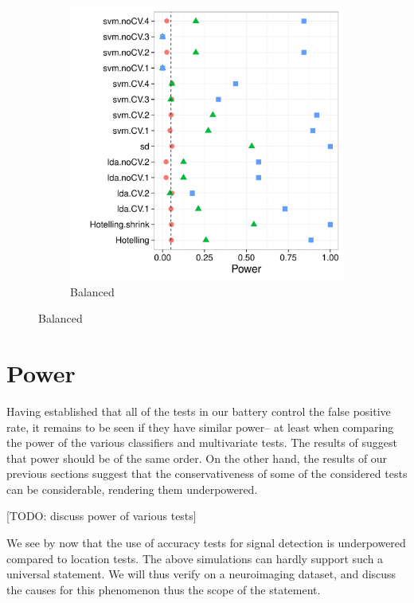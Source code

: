 \documentclass[12pt,a4paper]{article}
\begin{document}
\begin{figure}[h]
\begin{subfigure}{.5\textwidth}
	  \includegraphics[width=1\linewidth]{"art/2016-07-27 11:42:05"}
	  \caption{Balanced} %
	\label{fig:simulation_12}
	\end{subfigure}
	
\end{figure}




\section{Power}
\label{sec:power}

Having established that all of the tests in our battery control the false positive rate, it remains to be seen if they have similar power-- at least when comparing the power of the various classifiers and multivariate tests. 
The results of \cite{ramdas_classification_2016} suggest that power should be of the same order. 
On the other hand, the results of our previous sections suggest that the conservativeness of some of the considered tests can be considerable, rendering them underpowered. 

[TODO: discuss power of various tests]

We see by now that the use of accuracy tests for signal detection is underpowered compared to location tests. 
The above simulations can hardly support such a universal statement. 
We will thus verify on a neuroimaging dataset, and discuss the causes for this phenomenon thus the scope of the statement.
\end{document}
